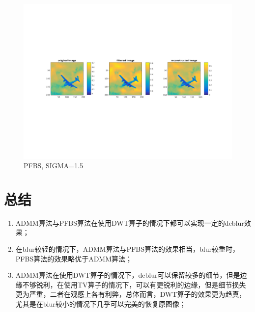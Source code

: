 \documentclass[a4paper, UTF8]{ctexrep}
\begin{document}
			\clearpage
			\begin{figure}[h]
				\centering
				\includegraphics[width=\textwidth]{hw4_fig12.png}
				\caption{PFBS, SIGMA=1.5}
				\label{fig:figure1}
			\end{figure}
			\clearpage

	\section{总结} %
	\label{sec:总结}
		\begin{enumerate}
			\item ADMM算法与PFBS算法在使用DWT算子的情况下都可以实现一定的deblur效果；
			\item 在blur较轻的情况下，ADMM算法与PFBS算法的效果相当，blur较重时，PFBS算法的效果略优于ADMM算法；
			\item ADMM算法在使用DWT算子的情况下，deblur可以保留较多的细节，但是边缘不够锐利，在使用TV算子的情况下，可以有更锐利的边缘，但是细节损失更为严重，二者在观感上各有利弊，总体而言，DWT算子的效果更为趋真，尤其是在blur较小的情况下几乎可以完美的恢复原图像；
		\end{enumerate}

	    
\end{document}
